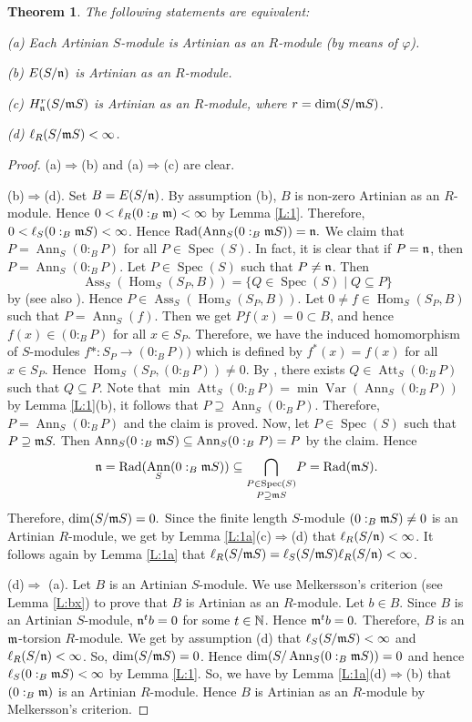 \documentclass[a4papersize]{article}
\newtheorem{theorem}{Theorem}[section]
\DeclareMathOperator{\Hom}{Hom}
\DeclareMathOperator{\Ann}{Ann}
\DeclareMathOperator{\Ass}{Ass}
\DeclareMathOperator{\Var}{Var}
\DeclareMathOperator{\Rad}{Rad}
\DeclareMathOperator{\Att}{Att}
\DeclareMathOperator{\Spec}{Spec}
\begin{document}
\begin{theorem}  \label{T:1} The following statements are equivalent:

(a)  Each Artinian $S$-module is Artinian as an $R$-module (by means of $\varphi$).

(b) $E(S/\frak n)$ is Artinian as an $R$-module.

(c) $H^r_{\frak n}(S/\frak mS)$ is Artinian as an $R$-module, where $r=\dim (S/\frak mS)$.

(d) $\ell_R(S/\frak m S)<\infty$.
\end{theorem}

\begin{proof} (a)$\Rightarrow$(b)  and (a)$\Rightarrow$(c) are clear.

(b)$\Rightarrow$(d).  Set $B=E(S/\frak n)$.  By assumption (b), $B$ is  non-zero Artinian as an $R$-module. Hence $0<\ell_R(0:_B\frak m)<\infty$ by Lemma \ref{L:1}.  Therefore, $0<\ell_S(0:_B\frak mS)<\infty$. Hence $\Rad (\Ann_S(0:_B\frak mS))=\frak n.$ We claim that $P= \Ann_S(0:_BP)$ for all  $P\in\Spec(S)$.  In fact, it is clear that if $P=\frak n$, then $P= \Ann_S(0:_BP)$. Let $P\in\Spec(S)$ such that $P\neq \frak n$. Then 
$$\Ass_S (\Hom_S(S_P, B))=\{Q\in\Spec(S)\mid Q\subseteq P\}$$
by \cite[Lemma 4.1]{MS} (see also \cite[Folgerlung 4.7]{Zos}). Hence $P\in \Ass_S (\Hom_S(S_P, B)).$ Let $0\neq f\in \Hom_S(S_P, B)$ such that $P=\Ann_S(f)$. Then we get $Pf(x)=0\subset B$, and hence $f(x)\in (0:_BP)$ for all $x\in S_P.$ Therefore, we have the induced homomorphism of $S$-modules  $f*: S_P\rightarrow  (0:_BP))$ which is defined by $f^*(x)=f(x)$ for all $x\in S_P.$ Hence $\Hom_S(S_P, (0:_BP))\neq 0$. By \cite[Lemma 7.2(2)]{MS}, there exists $Q\in \Att_S(0:_BP)$ such that $Q\subseteq P.$  Note that $\min\Att_S(0:_BP)=\min\Var (\Ann_S(0:_BP))$ by Lemma \ref{L:1}(b), it follows  that $P\supseteq \Ann_S(0:_BP).$ Therefore, $P= \Ann_S(0:_BP)$ and the claim is proved.  Now, let $P\in\Spec(S)$ such that $P\supseteq\frak mS.$ Then   $\Ann_S(0:_B\frak mS)\subseteq \Ann_S(0:_BP)=P$  by the claim. Hence $$\frak n=\Rad (\Ann_S(0:_B\frak mS))\subseteq \underset{P\supseteq \frak mS}{\underset{P\in\Spec(S)}\bigcap} P=\Rad (\frak m S).$$ Therefore, $\dim (S/\frak mS)=0.$ Since the finite length $S$-module $(0:_B\frak mS)\neq 0$ is an Artinian $R$-module, we get by Lemma \ref{L:1a}(c)$\Rightarrow$(d) that $\ell_R(S/\frak n)<\infty$. It follows again by Lemma \ref{L:1a} that $\ell_R(S/\frak mS)=\ell_S(S/\frak m S)\ell_R(S/\frak n)<\infty$.

(d)$\Rightarrow$ (a). Let $B$ is an Artinian $S$-module. We use Melkersson's criterion (see Lemma \ref{L:bx})  to prove that $B$ is Artinian as an $R$-module. Let $b\in B$. Since $B$ is an Artinian $S$-module, $\frak n^tb=0$ for some $t\in\Bbb N$.  Hence $\frak m^tb=0.$ Therefore,  $B$ is an $\frak m$-torsion $R$-module.  We get by assumption (d) that $\ell_S (S/\frak mS)<\infty$ and $\ell_R(S/\frak n)<\infty$. So, $\dim (S/\frak mS)=0$. Hence $\dim (S/\Ann_S(0:_B\frak mS))=0$ and hence $\ell_S(0:_B\frak mS)<\infty$ by Lemma \ref{L:1}. So, we have by Lemma \ref{L:1a}(d)$\Rightarrow$(b) that $(0:_B\frak m)$ is an Artinian $R$-module. Hence $B$ is Artinian as an $R$-module by Melkersson's criterion.



\end{proof}
\end{document}
